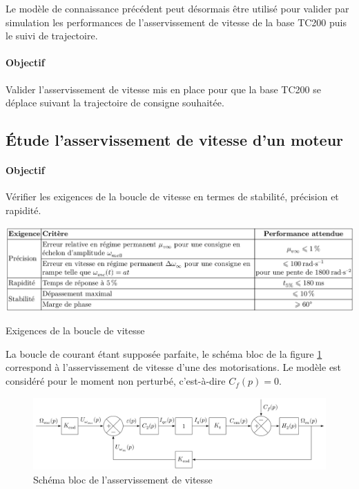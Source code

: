Le modèle de connaissance précédent peut désormais être utilisé pour valider par simulation les performances de l'asservissement de vitesse de la base TC200 puis le suivi de trajectoire.

\paragraph{Objectif} Valider l'asservissement de vitesse mis en place pour que la base TC200 se déplace suivant la trajectoire de consigne souhaitée.

\subsection{Étude l'asservissement de vitesse d'un moteur}

\paragraph{Objectif} Vérifier les exigences de la boucle de vitesse en termes de stabilité, précision et rapidité.

\newpage

\begin{table}[!ht]
\begin{center}
 \includegraphics[width=0.95\linewidth]{img/tab08.png}
 \end{center}
  \caption{Exigences de la boucle de vitesse}
\label{tab08}
\end{table}



La boucle de courant étant supposée parfaite, le schéma bloc de la figure \ref{fig19} correspond à l'asservissement de vitesse d'une des motorisations. Le modèle est considéré pour le moment non perturbé, c'est-à-dire $C_f(p)=0$.

\begin{figure}[!ht]
\begin{center}
 \includegraphics[width=0.95\linewidth]{img/fig19.png}
  \caption{Schéma bloc de l'asservissement de vitesse}
\label{fig19}
 \end{center}
\end{figure}

